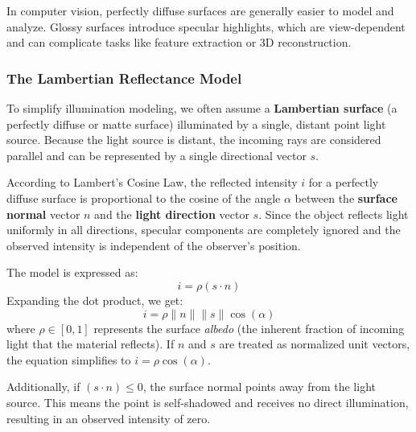 In computer vision, perfectly diffuse surfaces are generally easier to model and analyze. 
Glossy surfaces introduce specular highlights, which are view-dependent and can complicate tasks like feature extraction or 3D reconstruction.

\subsubsection{The Lambertian Reflectance Model}
To simplify illumination modeling, we often assume a \textbf{Lambertian surface} (a perfectly diffuse or matte surface) illuminated by a single, distant point light source. 
Because the light source is distant, the incoming rays are considered parallel and can be represented by a single directional vector $s$.

According to Lambert's Cosine Law, the reflected intensity $i$ for a perfectly diffuse surface is proportional to the cosine of the angle $\alpha$ between the \textbf{surface normal} vector $n$ and the \textbf{light direction} vector $s$. 
Since the object reflects light uniformly in all directions, specular components are completely ignored and the observed intensity is independent of the observer's position.

The model is expressed as:
\begin{equation}
    \label{eq:lambertian_reflectance_model}
    i = \rho (s \cdot n)
\end{equation}
Expanding the dot product, we get:
\begin{equation}
    i = \rho \|n\| \|s\| \cos(\alpha)
\end{equation}
where $\rho \in [0, 1]$ represents the surface \textit{albedo} (the inherent fraction of incoming light that the material reflects). If $n$ and $s$ are treated as normalized unit vectors, the equation simplifies to $i = \rho \cos(\alpha)$.

Additionally, if $(s \cdot n) \le 0$, the surface normal points away from the light source. 
This means the point is self-shadowed and receives no direct illumination, resulting in an observed intensity of zero.